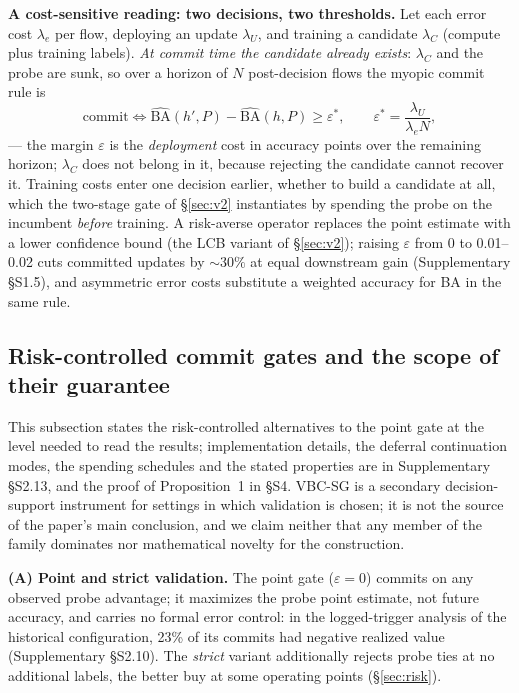 \documentclass[journal]{IEEEtran}
\begin{document}
\textbf{A cost-sensitive reading: two decisions, two thresholds.} Let each error cost $\lambda_e$ per flow, deploying an update $\lambda_U$, and training a candidate $\lambda_C$ (compute plus training labels). \emph{At commit time the candidate already exists}: $\lambda_C$ and the probe are sunk, so over a horizon of $N$ post-decision flows the myopic commit rule is
$$\mathrm{commit} \iff \widehat{\mathrm{BA}}(h',P) - \widehat{\mathrm{BA}}(h,P) \ge \varepsilon^{\ast}, \qquad \varepsilon^{\ast} = \frac{\lambda_U}{\lambda_e N},$$
--- the margin $\varepsilon$ is the \emph{deployment} cost in accuracy points over the remaining horizon; $\lambda_C$ does not belong in it, because rejecting the candidate cannot recover it. Training costs enter one decision earlier, whether to build a candidate at all, which the two-stage gate of \S\ref{sec:v2} instantiates by spending the probe on the incumbent \emph{before} training. A risk-averse operator replaces the point estimate with a lower confidence bound (the LCB variant of \S\ref{sec:v2}); raising $\varepsilon$ from 0 to 0.01--0.02 cuts committed updates by ${\sim}30\%$ at equal downstream gain (Supplementary \S S1.5), and asymmetric error costs substitute a weighted accuracy for BA in the same rule.


\subsection{Risk-controlled commit gates and the scope of their guarantee}
\label{sec:riskgates}

This subsection states the risk-controlled alternatives to the point gate at the level needed to read the results; implementation details, the deferral continuation modes, the spending schedules and the stated properties are in Supplementary \S S2.13, and the proof of Proposition~1 in \S S4. VBC-SG is a secondary decision-support instrument for settings in which validation is chosen; it is not the source of the paper's main conclusion, and we claim neither that any member of the family dominates nor mathematical novelty for the construction.

\textbf{(A) Point and strict validation.} The point gate ($\varepsilon{=}0$) commits on any observed probe advantage; it maximizes the probe point estimate, not future accuracy, and carries no formal error control: in the logged-trigger analysis of the historical configuration, 23\% of its commits had negative realized value (Supplementary \S S2.10). The \emph{strict} variant additionally rejects probe ties at no additional labels, the better buy at some operating points (\S\ref{sec:risk}).
\end{document}
